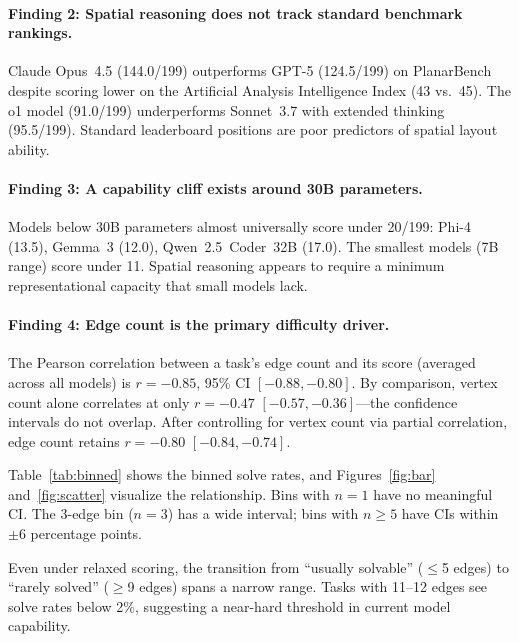 \documentclass{article}
\begin{document}
\paragraph{Finding 2: Spatial reasoning does not track standard benchmark rankings.}
Claude Opus~4.5 (144.0/199) outperforms GPT-5 (124.5/199) on PlanarBench despite scoring lower on the Artificial Analysis Intelligence Index (43 vs.\ 45). The o1 model (91.0/199) underperforms Sonnet~3.7 with extended thinking (95.5/199). Standard leaderboard positions are poor predictors of spatial layout ability.

\paragraph{Finding 3: A capability cliff exists around 30B parameters.}
Models below 30B parameters almost universally score under 20/199: Phi-4 (13.5), Gemma~3 (12.0), Qwen~2.5~Coder~32B (17.0). The smallest models (7B range) score under 11. Spatial reasoning appears to require a minimum representational capacity that small models lack.

\paragraph{Finding 4: Edge count is the primary difficulty driver.}
The Pearson correlation between a task's edge count and its score (averaged across all models) is $r = -0.85$, 95\% CI $[-0.88, -0.80]$. By comparison, vertex count alone correlates at only $r = -0.47$ $[-0.57, -0.36]$---the confidence intervals do not overlap. After controlling for vertex count via partial correlation, edge count retains $r = -0.80$ $[-0.84, -0.74]$.

Table~\ref{tab:binned} shows the binned solve rates, and Figures~\ref{fig:bar} and~\ref{fig:scatter} visualize the relationship. Bins with $n = 1$ have no meaningful CI. The 3-edge bin ($n = 3$) has a wide interval; bins with $n \ge 5$ have CIs within $\pm$6 percentage points.

Even under relaxed scoring, the transition from ``usually solvable'' ($\le$5 edges) to ``rarely solved'' ($\ge$9 edges) spans a narrow range. Tasks with 11--12 edges see solve rates below 2\%, suggesting a near-hard threshold in current model capability.
\end{document}
